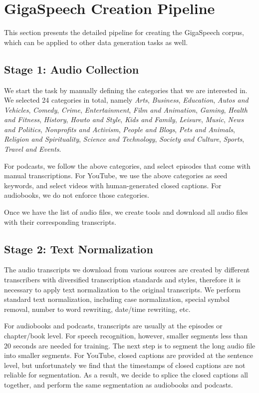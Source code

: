 \documentclass[a4paper]{article}
\begin{document}
\section{GigaSpeech Creation Pipeline}
This section presents the detailed pipeline for creating the GigaSpeech corpus,
which can be applied to other data generation tasks as well.

\subsection{Stage 1: Audio Collection}
We start the task by manually defining the categories that we are interested in.
We selected 24 categories in total, namely
{\it Arts}, {\it Business}, {\it Education}, {\it Autos and Vehicles},
{\it Comedy}, {\it Crime}, {\it Entertainment}, {\it Film and Animation},
{\it Gaming}, {\it Health and Fitness}, {\it History}, {\it Howto and Style},
{\it Kids and Family}, {\it Leisure}, {\it Music}, {\it News and Politics},
{\it Nonprofits and Activism}, {\it People and Blogs}, {\it Pets and Animals}, {\it Religion and Spirituality},
{\it Science and Technology}, {\it Society and Culture}, {\it Sports}, {\it Travel and Events}.

For podcasts, we follow the above categories, and select episodes that come with
manual transcriptions. For YouTube, we use the above categories as seed
keywords, and select videos with human-generated  closed captions. For audiobooks, we
do not enforce those categories.

Once we have the list of audio files, we create tools and download all audio files
with their corresponding transcripts.

\subsection{Stage 2: Text Normalization}
The audio transcripts we download from various sources are created by
different transcribers with diversified transcription standards and styles,
therefore it is necessary to apply text normalization to the original
transcripts. We perform standard text normalization, including case normalization,
special symbol removal, number to word rewriting, date/time rewriting, etc.



For audiobooks and podcasts, transcripts are usually at the episodes or chapter/book
level. For speech recognition, however, smaller segments less than 20 seconds are
needed for training. The next step is to segment the long audio file into smaller
segments. For YouTube, closed captions are provided at the sentence
level, but unfortunately we find that the timestamps of closed captions are not
reliable for segmentation. As a result, we decide to splice the closed captions
all together, and perform the same segmentation as audiobooks and podcasts.
\end{document}

